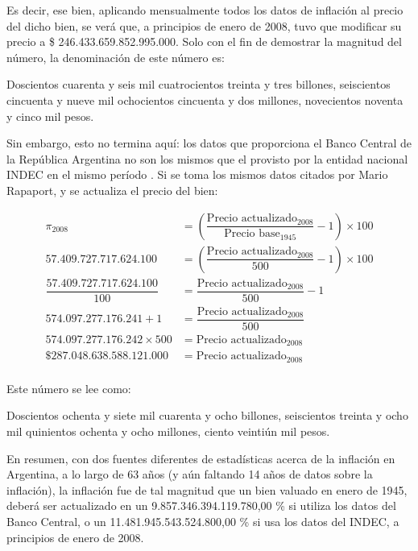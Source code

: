 \documentclass[12pt,a4paper,twoside]{book}
\begin{document}
Es decir, ese bien, aplicando mensualmente todos los datos de inflación al precio del dicho bien, se verá que, a principios de enero de 2008, tuvo que modificar su precio a \$ 246.433.659.852.995.000. Solo con el fin de demostrar la magnitud del número, la denominación de este número es:

\begin{center}
Doscientos cuarenta y seis mil cuatrocientos treinta y tres billones, seiscientos cincuenta y nueve mil ochocientos cincuenta y dos millones, novecientos noventa y cinco mil pesos.
\end{center}

Sin embargo, esto no termina aquí: los datos que proporciona el Banco Central de la República Argentina no son los mismos que el provisto por la entidad nacional INDEC en el mismo período \cite[pág. 16]{indec-hist}. Si se toma los mismos datos citados por Mario Rapaport, y se actualiza el precio del bien:

\begin{align*}
\pi_{2008} &= \left( \dfrac{\text{Precio actualizado}_{2008}}{\text{Precio base}_{1945}} - 1 \right) \times 100 \\
57.409.727.717.624.100 &= \left( \dfrac{\text{Precio actualizado}_{2008}}{500} - 1 \right) \times 100 \\
\dfrac{57.409.727.717.624.100}{100} &= \dfrac{\text{Precio actualizado}_{2008}}{500} - 1 \\
574.097.277.176.241 + 1 &= \dfrac{\text{Precio actualizado}_{2008}}{500} \\
574.097.277.176.242 \times 500 &= \text{Precio actualizado}_{2008} \\
\text{\$ } 287.048.638.588.121.000 &= \text{Precio actualizado}_{2008} \\
\end{align*}

Este número se lee como:

\begin{center}
Doscientos ochenta y siete mil cuarenta y ocho billones, seiscientos treinta y ocho mil quinientos ochenta y ocho millones, ciento veintiún mil pesos.
\end{center}

En resumen, con dos fuentes diferentes de estadísticas acerca de la inflación en Argentina, a lo largo de 63 años (y aún faltando 14 años de datos sobre la inflación), la inflación fue de tal magnitud que un bien valuado en enero de 1945, deberá ser actualizado en un 9.857.346.394.119.780,00 \% si utiliza los datos del Banco Central, o un 11.481.945.543.524.800,00 \% si usa los datos del INDEC, a principios de enero de 2008.
\end{document}

